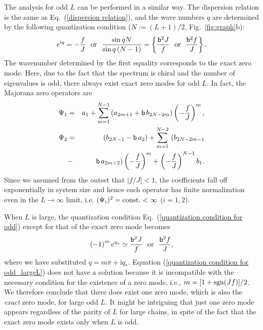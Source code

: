\documentclass[aps, prb, showpacs, twocolumn, %
amssymb,superscriptaddress]{revtex4}
\newcommand{\ii}{\text{i}}
\begin{document}
The analysis for odd $L$ can be performed in a similar way. The dispersion relation is the same as Eq.~(\ref{dispersion relation}), and the wave numbers $q$ are determined by the following quantization condition ($N:=(L+1) / 2$, Fig.~\ref{fig:graph}b):
\begin{equation}
e^{\ii q} = - \frac{f}{J}~~\mathrm{or}~~\frac{\sin qN}{\sin q \left( N-1 \right)} = \left\{ \frac{{\sf b}^{2} J}{f}~~\mathrm{or}~~\frac{{\sf b}^{2} f}{J} \right\}.
	\label{quantization condition for odd}
\end{equation}
The wavenumber determined by the first equality corresponds to the exact zero mode. Here, due to the fact that the spectrum is chiral and the number of eigenvalues is odd, there always exist exact zero modes for odd $L$. In fact, the Majorana zero operators are
\begin{eqnarray}
\Psi_{1} &=& a_{1} + \sum_{m=1}^{N-1}  \left( a_{2m+1} + {\sf b}\,  b_{2N-2m} \right) \left( - \frac{f}{J} \right)^{m}, \label{mu0 zero mode1} \\
\Psi_{2} &=& \left( b_{2N-1} - {\sf b}\, a_{2} \right)
+ \sum_{m=1}^{N-2}~( b_{2N-2m-1} \nonumber \\ 
&-& {\sf b}\, a_{2m+2} ) \left( - \frac{f}{J} \right)^{m} + \left( - \frac{f}{J} \right)^{N-1} b_{1}. \label{mu0 zero mode2}
\end{eqnarray}
Since we assumed from the outset that $|f/J|<1$, the coefficients fall off exponentially in system size and hence each operator has finite normalization even in the $L \to \infty$ limit, i.e. $(\Psi_i)^2 ={\rm const.}<\infty$ ($i=1,2$). 

When $L$ is large, the quantization condition Eq.~(\ref{quantization condition for odd}) except for that of the exact zero mode becomes 
\begin{equation}
\left( -1 \right)^{m} e^{q_{*}}\simeq \frac{{\sf b}^{2} J}{f}~~\mathrm{or}~~\frac{{\sf b}^{2} f}{J},
	\label{quantization condition for odd_largeL}
\end{equation}
where we have substituted $q = m\pi+\ii q_{*}$. 
Equation (\ref{quantization condition for odd_largeL}) does not have a solution because  it is incompatible with the necessary condition for the existence of a zero mode, i.e., $m=[1+{\rm sgn}(Jf)]/2$. 
We therefore conclude that there does exist one zero mode, which is also the \textit{exact} zero mode, for large odd $L$. It might be intriguing that just one zero mode appears regardless of the parity of $L$ for large chains, in spite of the fact that the exact zero mode exists only when $L$ is odd.
\end{document}
